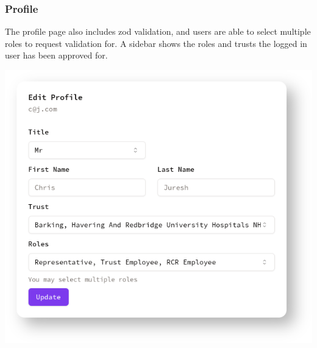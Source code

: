 \begin{minipage}{0.3\textwidth}
\subsubsection{Profile}
    The profile page also includes zod validation, and users are able to select multiple roles to request validation for. A sidebar shows the roles and trusts the logged in user has been approved for.

\end{minipage}
\hfill
\begin{minipage}{0.66\textwidth}
\includegraphics[width=\textwidth]{images/profile.png}
\end{minipage}